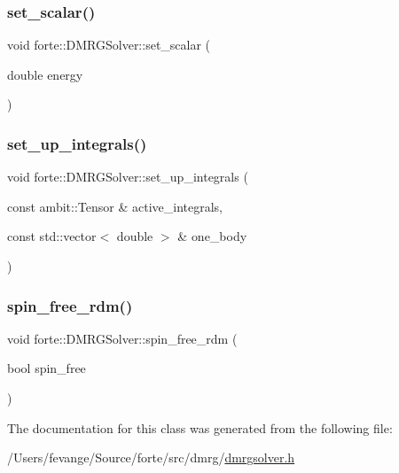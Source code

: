 \mbox{\label{classforte_1_1_d_m_r_g_solver_aca9ca177f2b8a10c9692eda29d883eec}} 
\subsubsection{\texorpdfstring{set\+\_\+scalar()}{set\_scalar()}}
{\footnotesize\ttfamily void forte\+::\+D\+M\+R\+G\+Solver\+::set\+\_\+scalar (\begin{DoxyParamCaption}\item[{double}]{energy }\end{DoxyParamCaption})\hspace{0.3cm}{\ttfamily [inline]}}

\mbox{\label{classforte_1_1_d_m_r_g_solver_a066b17dd1686e43c2de23ae57e6a3a64}} 
\subsubsection{\texorpdfstring{set\+\_\+up\+\_\+integrals()}{set\_up\_integrals()}}
{\footnotesize\ttfamily void forte\+::\+D\+M\+R\+G\+Solver\+::set\+\_\+up\+\_\+integrals (\begin{DoxyParamCaption}\item[{const ambit\+::\+Tensor \&}]{active\+\_\+integrals,  }\item[{const std\+::vector$<$ double $>$ \&}]{one\+\_\+body }\end{DoxyParamCaption})\hspace{0.3cm}{\ttfamily [inline]}}

\mbox{\label{classforte_1_1_d_m_r_g_solver_a7f34b4aa229850ce78701122f7f20aa0}} 
\subsubsection{\texorpdfstring{spin\+\_\+free\+\_\+rdm()}{spin\_free\_rdm()}}
{\footnotesize\ttfamily void forte\+::\+D\+M\+R\+G\+Solver\+::spin\+\_\+free\+\_\+rdm (\begin{DoxyParamCaption}\item[{bool}]{spin\+\_\+free }\end{DoxyParamCaption})\hspace{0.3cm}{\ttfamily [inline]}}



The documentation for this class was generated from the following file\+:\begin{DoxyCompactItemize}
\item 
/\+Users/fevange/\+Source/forte/src/dmrg/\mbox{\hyperlink{dmrgsolver_8h}{dmrgsolver.\+h}}\end{DoxyCompactItemize}
